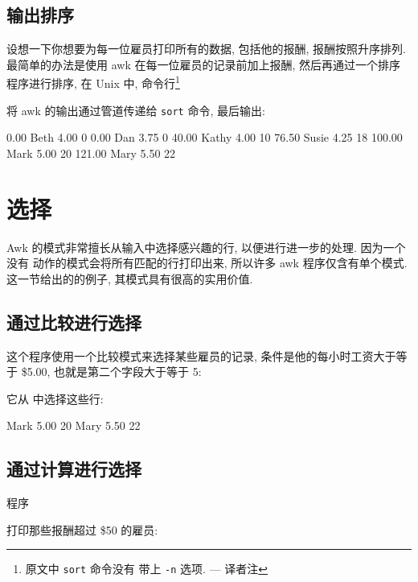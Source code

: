 \subsection{输出排序}
\label{subsec:sorting_the_output}

设想一下你想要为每一位雇员打印所有的数据, 包括他的报酬, 报酬按照升序排列.
最简单的办法是使用 awk 在每一位雇员的记录前加上报酬, 然后再通过一个排序
程序进行排序, 在 Unix 中, 命令行\footnote{原文中 \texttt{sort} 命令没有
带上 \texttt{-n} 选项. --- 译者注}
将 awk 的输出通过管道传递给 \texttt{sort} 命令, 最后输出:
\begin{file}
      0.00 Beth    4.00    0
      0.00 Dan     3.75    0
     40.00 Kathy   4.00    10
     76.50 Susie   4.25    18
    100.00 Mark    5.00    20
    121.00 Mary    5.50    22
\end{file}

\section{选择}
\label{sec:selection}

Awk 的模式非常擅长从输入中选择感兴趣的行, 以便进行进一步的处理. 因为一个没有
动作的模式会将所有匹配的行打印出来, 所以许多 awk 程序仅含有单个模式.
这一节给出的的例子, 其模式具有很高的实用价值.

\subsection{通过比较进行选择}
\label{subsec:selection_by_comparison}

这个程序使用一个比较模式来选择某些雇员的记录, 条件是他的每小时工资大于等于
\$5.00, 也就是第二个字段大于等于 5:
它从  中选择这些行:
\begin{awkcode}
    Mark    5.00    20
    Mary    5.50    22
\end{awkcode}

\subsection{通过计算进行选择}
\label{subsec:selection_by_computation}

程序
打印那些报酬超过 \$50 的雇员:

